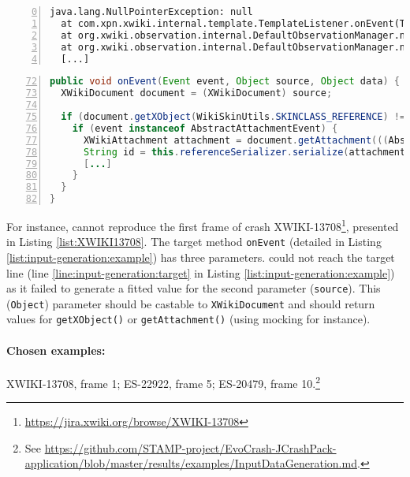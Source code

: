 \begin{lstlisting}[frame=tb,
  caption={Excerpt of the stack trace for the crash XWIKI-13708},
  label=list:XWIKI13708,
  captionpos=t,
  numbers=left,
  float=t,
  firstnumber=0]
java.lang.NullPointerException: null
  at com.xpn.xwiki.internal.template.TemplateListener.onEvent(TemplateListener.java:79)
  at org.xwiki.observation.internal.DefaultObservationManager.notify(DefaultObservationManager.java:307)
  at org.xwiki.observation.internal.DefaultObservationManager.notify(DefaultObservationManager.java:269)
  [...]
\end{lstlisting}

\begin{lstlisting}[frame=tb,
  caption={Code excerpt from method \texttt{onEvent} in \texttt{TemplateListener.java}},
  label=list:input-generation:example,
  captionpos=t,
  language=Java,
  numbers=left,
  firstnumber=72,
  float=t,
  stepnumber=1]
public void onEvent(Event event, Object source, Object data) {
  XWikiDocument document = (XWikiDocument) source;

  if (document.getXObject(WikiSkinUtils.SKINCLASS_REFERENCE) != null) {
    if (event instanceof AbstractAttachmentEvent) {
      XWikiAttachment attachment = document.getAttachment(((AbstractAttachmentEvent) event).getName());
      String id = this.referenceSerializer.serialize(attachment.getReference()); // target line (*@\label{line:input-generation:target}@*)
      [...]
    }
  }
}
\end{lstlisting}

For instance, \evocrash cannot reproduce the first frame of crash XWIKI-13708\footnote{\url{https://jira.xwiki.org/browse/XWIKI-13708}}, presented in Listing \ref{list:XWIKI13708}. The target method \texttt{onEvent} (detailed in Listing \ref{list:input-generation:example}) has three parameters.
\evocrash could not reach the target line (line \ref{line:input-generation:target} in Listing \ref{list:input-generation:example}) as it failed to generate a fitted value for the second parameter (\texttt{source}). This (\texttt{Object}) parameter should be castable to \texttt{XWikiDocument} and should return values for \texttt{getXObject()} or \texttt{getAttachment()} (using mocking for instance).

\paragraph{Chosen examples:} 
XWIKI-13708, frame 1;
ES-22922, frame 5;
ES-20479, frame 10.\footnote{See \url{https://github.com/STAMP-project/EvoCrash-JCrashPack-application/blob/master/results/examples/InputDataGeneration.md}.}


